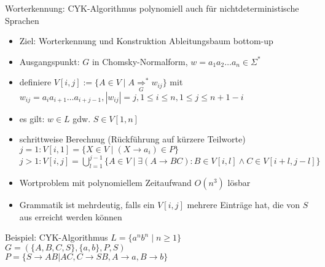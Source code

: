 \begin{frame}{Worterkennung: CYK-Algorithmus}
	polynomiell auch für nichtdeterministische Sprachen
	\begin{itemize}
		\item Ziel: Worterkennung und Konstruktion Ableitungsbaum bottom-up
		\item Ausgangspunkt: $G$ in Chomsky-Normalform, $w=a_1a_2 \ldots a_n \in \Sigma^*$
		\item definiere $V[i,j]:=\{A \in V \mid A \underset{G}{\Rightarrow}^* w_{ij} \}$ mit\\
		$w_{ij}=a_ia_{i+1}\ldots a_{i+j-1}, |w_{ij}|=j, 1\leq i \leq n, 1\leq j \leq n+1-i$
		\item es gilt: $w\in L$ gdw. $S \in V[1,n]$
		\item schrittweise Berechnug (Rückführung auf kürzere Teilworte)\\
		$j=1: V[i,1]=\{X \in V \mid (X\rightarrow a_i) \in P\}$\\
		$j>1: V[i,j]=\bigcup_{l=1}^{j-1}\{A\in V\mid \exists (A\rightarrow BC): B \in V[i,l] \land C \in V[i+l, j-l] \}$
		\item Wortproblem mit polynomiellem Zeitaufwand $O(n^3)$ lösbar
		\item Grammatik ist mehrdeutig, falls ein $V[i,j]$ mehrere Einträge hat, die von $S$ aus erreicht werden können
	\end{itemize}
\end{frame}

\begin{frame}{Beispiel: CYK-Algorithmus}
	$L=\{a^nb^n\mid n\geq 1\}$\\
	$G=(\{A, B, C, S\}, \{a, b\}, P, S)$\\
	$P=\{S \rightarrow AB|AC, C\rightarrow SB, A\rightarrow a, B\rightarrow b\}$
\end{frame}


